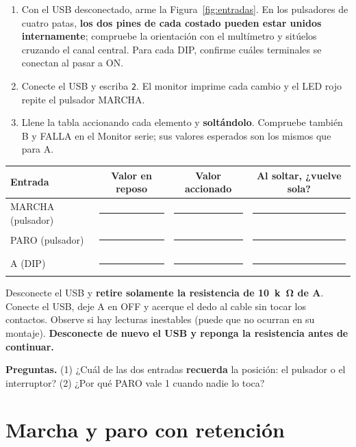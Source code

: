 \documentclass[11pt,a4paper]{article}
\newcommand{\linea}[1][3cm]{\rule{#1}{0.4pt}}
\begin{document}
\begin{enumerate}
  \item Con el USB desconectado, arme la Figura~\ref{fig:entradas}. En los pulsadores de cuatro patas, \textbf{los dos pines de cada costado pueden estar unidos internamente}; compruebe la orientación con el multímetro y sitúelos cruzando el canal central. Para cada DIP, confirme cuáles terminales se conectan al pasar a ON.
  \item Conecte el USB y escriba \texttt{2}. El monitor imprime cada cambio y el LED rojo repite el pulsador MARCHA.
  \item Llene la tabla accionando cada elemento y \textbf{soltándolo}. Compruebe también B y FALLA en el Monitor serie; sus valores esperados son los mismos que para A.
\end{enumerate}

\begin{center}\small\renewcommand{\arraystretch}{1.5}
\begin{tabular}{@{}l c c c@{}}
\toprule
\textbf{Entrada} & \textbf{Valor en reposo} & \textbf{Valor accionado} & \textbf{Al soltar, ¿vuelve sola?}\\
\midrule
MARCHA (pulsador) & \linea[1.5cm] & \linea[1.5cm] & \linea[2cm]\\
PARO (pulsador) & \linea[1.5cm] & \linea[1.5cm] & \linea[2cm]\\
A (DIP) & \linea[1.5cm] & \linea[1.5cm] & \linea[2cm]\\
\bottomrule
\end{tabular}
\end{center}

\begin{falla}
Desconecte el USB y \textbf{retire solamente la resistencia de \SI{10}{k\ohm} de A}. Conecte el USB, deje A en OFF y acerque el dedo al cable sin tocar los contactos. Observe si hay lecturas inestables (puede que no ocurran en su montaje). \textbf{Desconecte de nuevo el USB y reponga la resistencia antes de continuar.}
\end{falla}

\textbf{Preguntas.} (1) ¿Cuál de las dos entradas \textbf{recuerda} la posición: el pulsador o el interruptor? (2) ¿Por qué PARO vale 1 cuando nadie lo toca?

\section{Marcha y paro con retención}
\end{document}

